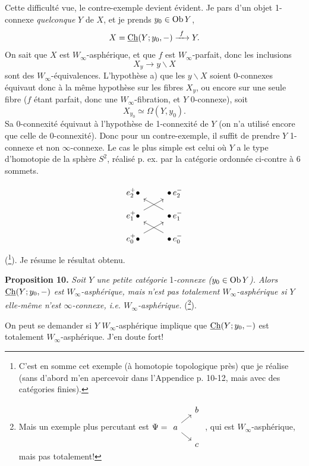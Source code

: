 Cette difficulté vue, le contre-exemple devient évident. Je pars d'un objet 1-connexe \textit{quelconque} $Y$ de $X$, et je prends $y_0 \in \mathrm{Ob}\, Y$,
\[
X = \underline{\mathrm{Ch}}(Y; y_0, -) \xrightarrow{\ f\ } Y.
\]
On sait que $X$ est $W_\infty$-asphérique, et que $f$ est $W_\infty$-parfait, donc les inclusions
\[
X_y \longrightarrow y\backslash X
\]
sont des $W_\infty$-équivalences. L'hypothèse a) que les $y\backslash X$ soient 0-connexes équivaut donc à la même hypothèse sur les fibres $X_y$, ou
encore sur une seule fibre ($f$ étant parfait, donc une $W_\infty$-fibration, et $Y$ 0-connexe), soit
\[
X_{y_0} \simeq \Omega(Y, y_0).
\]
Sa 0-connexité équivaut à l'hypothèse de 1-connexité de $Y$ (on n'a utilisé encore que celle de 0-connexité). Donc pour un contre-exemple, il suffit de prendre $Y$ 1-connexe et non $\infty$-connexe. Le cas le plus simple est celui où $Y$ a le type d'homotopie de la sphère $S^2$, réalisé p. ex. par la catégorie ordonnée ci-contre à 6 sommets.

\[
\begin{tikzcd}[row sep=small]
e_2^+ \bullet & \bullet\, e_2^- \\
e_1^+ \bullet \arrow[ur] & \bullet\, e_1^- \arrow[ul] \\
e_0^+ \bullet \arrow[ur] & \bullet\, e_0^- \arrow[ul]
\end{tikzcd}
\]
 (\footnote{C'est en somme cet exemple (à homotopie topologique près) que je réalise (sans d'abord m'en apercevoir dans l'Appendice p. 10-12, mais avec des catégories finies).}). Je résume le résultat obtenu.

\textbf{Proposition 10.} \textit{Soit $Y$ une petite catégorie} 1\textit{-connexe ($y_0 \in \mathrm{Ob}\, Y$). Alors} $\underline{\mathrm{Ch}}(Y; y_0, -)$ \textit{est $W_\infty$-asphérique, mais n'est pas totalement $W_\infty$-asphérique si $Y$ elle-même n'est $\infty$-connexe, i.e. $W_\infty$-asphérique.} (\footnote{Mais un exemple plus percutant est $\Psi = \begin{tikzcd}[ampersand replacement=\&, row sep=small, column sep=small, baseline=(A.base)]
 \& b \\
|[alias=A]| a \arrow[ur] \arrow[dr] \& \\
 \& c
\end{tikzcd}$ , qui est $W_\infty$-asphérique, mais pas totalement!}).

On peut se demander si $Y$ $W_\infty$-asphérique implique que $\underline{\mathrm{Ch}}(Y; y_0, -)$ est totalement $W_\infty$-asphérique. J'en doute fort!

